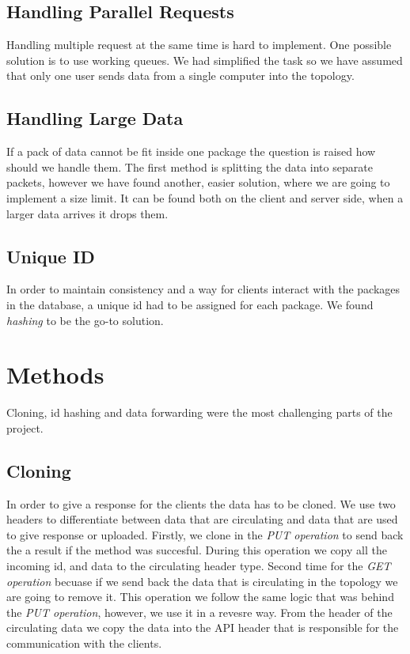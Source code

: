 \documentclass[sigconf,natbib=false]{acmart}
\begin{document}
\subsection{Handling Parallel Requests}
Handling multiple request at the same time is hard to implement. One possible solution is to use working queues. We had simplified the task so we have assumed that only one user sends data from a single computer into the topology.
\subsection{Handling Large Data}
If a pack of data cannot be fit inside one package the question is raised how should we handle them. The first method is splitting the data into separate packets, however we have found another, easier solution, where we are going to implement a size limit. It can be found both on the client and server side, when a larger data arrives it drops them.
\subsection{Unique ID}
In order to maintain consistency and a way for clients interact with the packages in the database, a unique id had to be assigned for each package. We found \textit{hashing} to be the go-to solution.
\section{Methods}
Cloning, id hashing and data forwarding were the most challenging parts of the project.
\subsection{Cloning}
In order to give a response for the clients the data has to be cloned. We use two headers to differentiate between data that are circulating and data that are used to give response or uploaded. Firstly, we clone in the \textit{PUT operation} to send back the a result if the method was succesful. During this operation we copy all the incoming id, and data to the circulating header type. Second time for the \textit{GET operation} becuase if we send back the data that is circulating in the topology we are going to remove it. This operation we follow the same logic that was behind the \textit{PUT operation}, however, we use it in a revesre way. From the header of the circulating data we copy the data into the API header that is responsible for the communication with the clients.
\cite{cloning1} \cite{cloning2}
\end{document}
